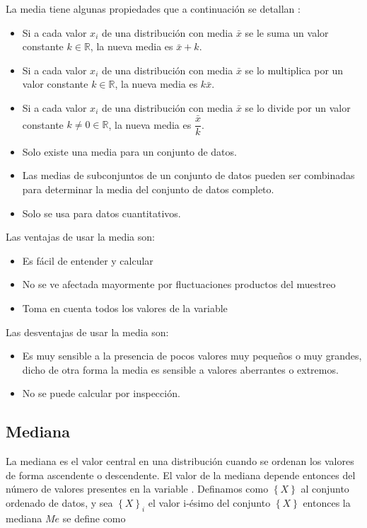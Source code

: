 \documentclass[letterpaper,]{book}
\providecommand{\tightlist}{%
  \setlength{\itemsep}{0pt}\setlength{\parskip}{0pt}}
\begin{document}
La media tiene algunas propiedades que a continuación se detallan \citep{uboe2017}:

\begin{itemize}
\tightlist
\item
  Si a cada valor \(x_i\) de una distribución con media \(\bar{x}\) se le suma un valor constante \(k \in \mathbb{R}\), la nueva media es \(\bar{x}+k\).
\item
  Si a cada valor \(x_i\) de una distribución con media \(\bar{x}\) se lo multiplica por un valor constante \(k \in \mathbb{R}\), la nueva media es \(k\bar{x}\).
\item
  Si a cada valor \(x_i\) de una distribución con media \(\bar{x}\) se lo divide por un valor constante \(k \neq 0 \in \mathbb{R}\), la nueva media es \(\dfrac{\bar{x}}{k}\).
\item
  Solo existe una media para un conjunto de datos.
\item
  Las medias de subconjuntos de un conjunto de datos pueden ser combinadas para determinar la media del conjunto de datos completo.
\item
  Solo se usa para datos cuantitativos.
\end{itemize}

Las ventajas de usar la media son:

\begin{itemize}
\tightlist
\item
  Es fácil de entender y calcular
\item
  No se ve afectada mayormente por fluctuaciones productos del muestreo
\item
  Toma en cuenta todos los valores de la variable
\end{itemize}

Las desventajas de usar la media son:

\begin{itemize}
\tightlist
\item
  Es muy sensible a la presencia de pocos valores muy pequeños o muy grandes, dicho de otra forma la media es sensible a valores aberrantes o extremos.
\item
  No se puede calcular por inspección.
\end{itemize}

\hypertarget{mediana}{%
\subsection{Mediana}\label{mediana}}

La mediana es el valor central en una distribución cuando se ordenan los valores de forma ascendente o descendente. El valor de la mediana depende entonces del número de valores presentes en la variable \citep{barrow2006}. Definamos como \(\left\{ X \right \}\) al conjunto ordenado de datos, y sea \(\left \{ X \right \}_i\) el valor i-ésimo del conjunto \(\left \{ X \right \}\) entonces la mediana \(Me\) se define como
\end{document}
